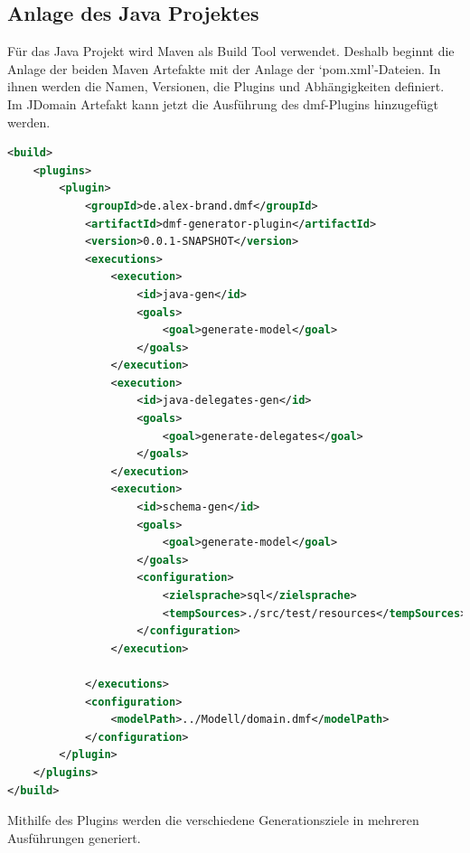 \documentclass[./einleitung.tex]{subfiles}
\begin{document}
    \subsection{Anlage des Java Projektes}\label{subsec:anlage-des-java-projektes}
    Für das Java Projekt wird Maven als Build Tool verwendet.
    Deshalb beginnt die Anlage der beiden Maven Artefakte mit der Anlage der `pom.xml'-Dateien.
    In ihnen werden die Namen, Versionen, die Plugins und Abhängigkeiten definiert.\\
    Im JDomain Artefakt kann jetzt die Ausführung des \acrshort{dmf}-Plugins hinzugefügt werden.
    \begin{lstlisting}[language=XML, caption=Konfiguration des \acrshort{dmf}-Plugins, label=lst:jdomainPlugins]
<build>
    <plugins>
        <plugin>
            <groupId>de.alex-brand.dmf</groupId>
            <artifactId>dmf-generator-plugin</artifactId>
            <version>0.0.1-SNAPSHOT</version>
            <executions>
                <execution>
                    <id>java-gen</id>
                    <goals>
                        <goal>generate-model</goal>
                    </goals>
                </execution>
                <execution>
                    <id>java-delegates-gen</id>
                    <goals>
                        <goal>generate-delegates</goal>
                    </goals>
                </execution>
                <execution>
                    <id>schema-gen</id>
                    <goals>
                        <goal>generate-model</goal>
                    </goals>
                    <configuration>
                        <zielsprache>sql</zielsprache>
                        <tempSources>./src/test/resources</tempSources>
                    </configuration>
                </execution>

            </executions>
            <configuration>
                <modelPath>../Modell/domain.dmf</modelPath>
            </configuration>
        </plugin>
    </plugins>
</build>
    \end{lstlisting}
    Mithilfe des Plugins werden die verschiedene Generationsziele in mehreren Ausführungen generiert.
\end{document}

